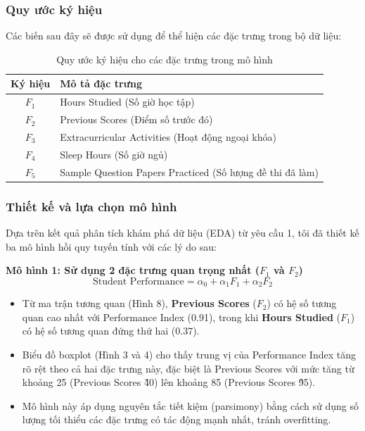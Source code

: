 \subsubsection{Quy ước ký hiệu}
Các biến sau đây sẽ được sử dụng để thể hiện các đặc trưng trong bộ dữ liệu:
\begin{table}[H]
	\centering
	\begin{tabular}{|c|l|}
		\hline
		\textbf{Ký hiệu} & \textbf{Mô tả đặc trưng}                                  \\
		\hline
		$F_1$            & Hours Studied (Số giờ học tập)                            \\
		$F_2$            & Previous Scores (Điểm số trước đó)                        \\
		$F_3$            & Extracurricular Activities (Hoạt động ngoại khóa)         \\
		$F_4$            & Sleep Hours (Số giờ ngủ)                                  \\
		$F_5$            & Sample Question Papers Practiced (Số lượng đề thi đã làm) \\
		\hline
	\end{tabular}
	\caption{Quy ước ký hiệu cho các đặc trưng trong mô hình}
\end{table}

\subsubsection{Thiết kế và lựa chọn mô hình}

Dựa trên kết quả phân tích khám phá dữ liệu (EDA) từ yêu cầu 1, tôi đã thiết kế ba mô hình hồi quy tuyến tính với các lý do sau:

\textbf{Mô hình 1: Sử dụng 2 đặc trưng quan trọng nhất ($F_1$ và $F_2$)}
$$ \text{Student Performance} = \alpha_{0} + \alpha_{1}F_{1} + \alpha_{2}F_{2} $$

\begin{itemize}
	\item Từ ma trận tương quan (Hình 8), \textbf{Previous Scores} ($F_2$) có hệ số tương quan cao nhất với Performance Index (0.91), trong khi \textbf{Hours Studied} ($F_1$) có hệ số tương quan đứng thứ hai (0.37).
	\item Biểu đồ boxplot (Hình 3 và 4) cho thấy trung vị của Performance Index tăng rõ rệt theo cả hai đặc trưng này, đặc biệt là Previous Scores với mức tăng từ khoảng 25 (Previous Scores \~40) lên khoảng 85 (Previous Scores \~95).
	\item Mô hình này áp dụng nguyên tắc tiết kiệm (parsimony) bằng cách sử dụng số lượng tối thiểu các đặc trưng có tác động mạnh nhất, tránh overfitting.\cite{parsimony}
\end{itemize}

